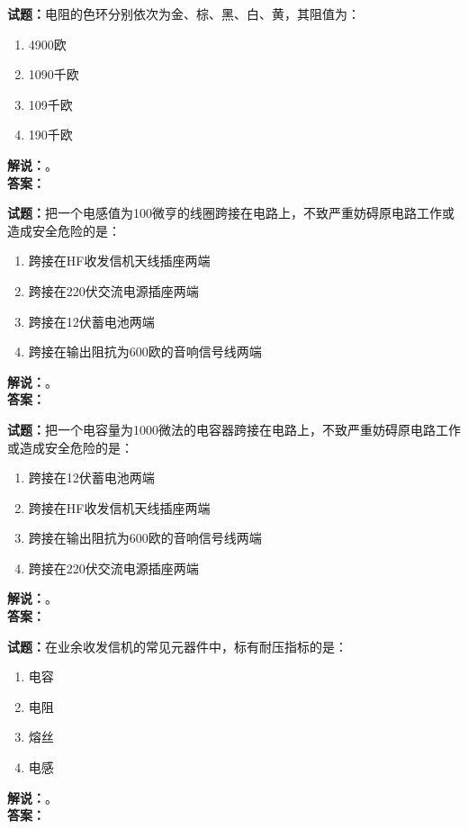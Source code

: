 \documentclass{ctexbook}
\begin{document}
\vspace{\baselineskip}

\noindent\textbf{试题：}电阻的色环分别依次为金、棕、黑、白、黄，其阻值为：
\begin{enumerate}[leftmargin=3em]
  \item 4900欧
  \item 1090千欧
  \item 109千欧
  \item 190千欧
\end{enumerate}
\noindent\textbf{解说：}\textbf{}。\\\noindent\textbf{答案：}

\vspace{\baselineskip}

\noindent\textbf{试题：}把一个电感值为100微亨的线圈跨接在电路上，不致严重妨碍原电路工作或造成安全危险的是：
\begin{enumerate}[leftmargin=3em]
  \item 跨接在HF收发信机天线插座两端
  \item 跨接在220伏交流电源插座两端
  \item 跨接在12伏蓄电池两端
  \item 跨接在输出阻抗为600欧的音响信号线两端
\end{enumerate}
\noindent\textbf{解说：}\textbf{}。\\\noindent\textbf{答案：}

\vspace{\baselineskip}

\noindent\textbf{试题：}把一个电容量为1000微法的电容器跨接在电路上，不致严重妨碍原电路工作或造成安全危险的是：
\begin{enumerate}[leftmargin=3em]
  \item 跨接在12伏蓄电池两端
  \item 跨接在HF收发信机天线插座两端
  \item 跨接在输出阻抗为600欧的音响信号线两端
  \item 跨接在220伏交流电源插座两端
\end{enumerate}
\noindent\textbf{解说：}\textbf{}。\\\noindent\textbf{答案：}

\vspace{\baselineskip}

\noindent\textbf{试题：}在业余收发信机的常见元器件中，标有耐压指标的是：
\begin{enumerate}[leftmargin=3em]
  \item 电容
  \item 电阻
  \item 熔丝
  \item 电感
\end{enumerate}
\noindent\textbf{解说：}\textbf{}。\\\noindent\textbf{答案：}
\end{document}
